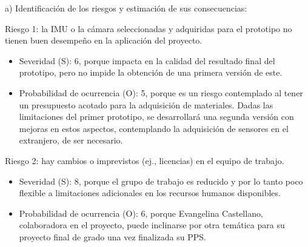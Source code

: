 \documentclass[
11pt, %
codirector, %
]{charter}
\begin{document}







a) Identificación de los riesgos y estimación de sus consecuencias:

Riesgo 1: la IMU o la cámara seleccionadas y adquiridas para el prototipo no tienen buen desempeño en la aplicación del proyecto.
\begin{itemize}
	\item Severidad (S): 6, porque impacta en la calidad del resultado final del prototipo, pero no impide la obtención de una primera versión de este.
	\item Probabilidad de ocurrencia (O): 5, porque es un riesgo contemplado al tener un presupuesto acotado para la adquisición de materiales. Dadas las limitaciones del primer prototipo, se desarrollará una segunda versión con mejoras en estos aspectos, contemplando la adquisición de sensores en el extranjero, de ser necesario.
\end{itemize}

Riesgo 2: hay cambios o imprevistos (ej., licencias) en el equipo de trabajo.
\begin{itemize}
	\item Severidad (S): 8, porque el grupo de trabajo es reducido y por lo tanto poco flexible a limitaciones adicionales en los recursos humanos disponibles.
	\item Probabilidad de ocurrencia (O): 6, porque Evangelina Castellano, colaboradora en el proyecto, puede inclinarse por otra temática para su proyecto final de grado una vez finalizada su PPS.
\end{itemize}
\end{document}
